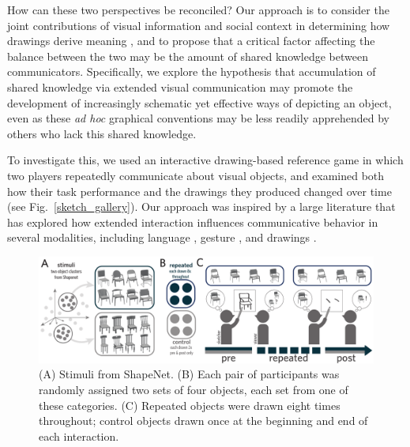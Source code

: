 \documentclass[10pt,letterpaper]{article}
\begin{document}
How can these two perspectives be reconciled?
Our approach is to consider the joint contributions of visual information and social context in determining how drawings derive meaning \cite{abell2009canny}, and to propose that a critical factor affecting the balance between the two may be the amount of shared knowledge between communicators.
Specifically, we explore the hypothesis that accumulation of shared knowledge via extended visual communication may promote the development of increasingly schematic yet effective ways of depicting an object, even as these \textit{ad hoc} graphical conventions may be less readily apprehended by others who lack this shared knowledge.

To investigate this, we used an interactive drawing-based reference game in which two players repeatedly communicate about visual objects, and examined both how their task performance and the drawings they produced changed over time (see Fig.~\ref{sketch_gallery}).
Our approach was inspired by a large literature that has explored how extended interaction influences communicative behavior in several modalities, including language \cite{krauss1964changes,ClarkWilkesGibbs86_ReferringCollaborative,HawkinsFrankGoodman17_ConventionFormation}, gesture \cite{goldin1996silence,fay2014creating}, and drawings \cite{garrod_foundations_2007,galantucci2005experimental,fay2010interactive}.

\begin{figure}
\begin{center}
\includegraphics[width=0.86\linewidth]{figures/task_stimuli.pdf}
\caption{(A) Stimuli from ShapeNet. (B) Each pair of participants was randomly assigned two sets of four objects, each set from one of these categories. (C) Repeated objects were drawn eight times throughout; control objects drawn once at the beginning and end of each interaction.}
\label{task_stimuli}
\vspace{-1em}
\end{center}
\end{figure}

\end{document}
